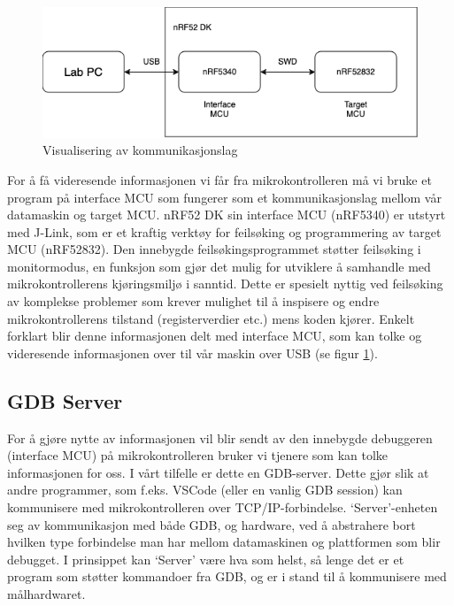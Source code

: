 \begin{figure}[ht]
    \centering
    \includegraphics[scale=0.60]{Main/figures/nrf52_debug_swd.png}
    \caption{Visualisering av kommunikasjonslag}
    \label{fig:debugging_swd}
\end{figure}

For å få videresende informasjonen vi får fra mikrokontrolleren må vi bruke et program på interface MCU som fungerer som et kommunikasjonslag mellom vår datamaskin og target MCU. nRF52 DK sin interface MCU (nRF5340) er utstyrt med J-Link, som er et kraftig verktøy for feilsøking og programmering av target MCU (nRF52832). Den innebygde feilsøkingsprogrammet støtter feilsøking i monitormodus, en funksjon som gjør det mulig for utviklere å samhandle med mikrokontrollerens kjøringsmiljø i sanntid. Dette er spesielt nyttig ved feilsøking av komplekse problemer som krever mulighet til å inspisere og endre mikrokontrollerens tilstand (registerverdier etc.) mens koden kjører. Enkelt forklart blir denne informasjonen delt med interface MCU, som kan tolke og videresende informasjonen over til vår maskin over USB (se figur \ref{fig:debugging_swd}). 


\subsection{GDB Server}

For å gjøre nytte av informasjonen vil blir sendt av den innebygde debuggeren (interface MCU) på mikrokontrolleren bruker vi tjenere som kan tolke informasjonen for oss. I vårt tilfelle er dette en GDB-server. Dette gjør slik at andre programmer, som f.eks. VSCode (eller en vanlig GDB session) kan kommunisere med mikrokontrolleren over TCP/IP-forbindelse. `Server'-enheten seg av kommunikasjon med både GDB, og hardware, ved å abstrahere bort hvilken type forbindelse man har mellom datamaskinen og plattformen som blir debugget. I prinsippet kan `Server' være hva som helst, så lenge det er et program som støtter kommandoer fra GDB, og er i stand til å kommunisere med målhardwaret. 


